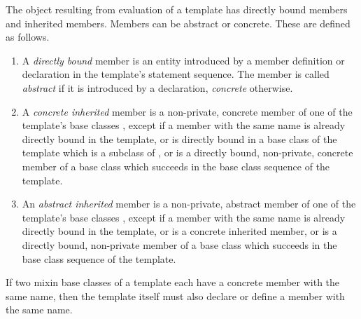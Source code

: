 \documentclass[11pt]{report}
\newcommand{\ifqualified}[1]{}
\begin{document}
\label{sec:members}

The object resulting from evaluation of a template has directly bound
members and inherited members. Members can be abstract or concrete.
These are defined as follows.
\begin{enumerate}
\item
A {\em directly bound} member is an entity introduced by a member
definition or declaration in the template's statement sequence. The
member is called {\em abstract} if it is introduced by a declaration,
{\em concrete} otherwise.
\item
A {\em concrete inherited} member is a non-private, concrete member of
one of the template's base classes \verb@B@, except if a member with the
same \ifqualified{qualified} name is already directly bound in the template, or is
directly bound in a base class of the template which is a subclass of
\verb@B@, or is a directly bound, non-private, concrete member of a base
class which succeeds \verb@B@ in the base class sequence of the template.
\item
An {\em abstract inherited} member is a non-private, abstract member
of one of the template's base classes \verb@B@, except if a member with the
same \ifqualified{qualified} name is already directly bound in the template, or is a
concrete inherited member, or is a directly bound, non-private member
of a base class which succeeds \verb@b@ in the base class sequence of the
template.
\end{enumerate}

If two mixin base classes of a template each have a concrete member with the same
name, then the template itself must also declare or define a member with the same name.
\end{document}
